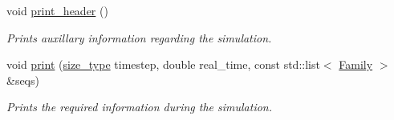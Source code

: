 \begin{DoxyCompactItemize}
void \hyperlink{classretrocombinator_1_1Output_a210fa5a86077912c8cf95d15603c1ad2}{print\+\_\+header} ()
\begin{DoxyCompactList}\small\item\em Prints auxillary information regarding the simulation. \end{DoxyCompactList}\item 
\mbox{\label{classretrocombinator_1_1Output_a9b28f297886b9e8f1e764b688c9a9da7}} 
void \hyperlink{classretrocombinator_1_1Output_a9b28f297886b9e8f1e764b688c9a9da7}{print} (\hyperlink{namespaceretrocombinator_a8e1541b50cee66a791df4c437ccbb385}{size\+\_\+type} timestep, double real\+\_\+time, const std\+::list$<$ \hyperlink{classretrocombinator_1_1Family}{Family} $>$ \&seqs)
\begin{DoxyCompactList}\small\item\em Prints the required information during the simulation. \end{DoxyCompactList}\end{DoxyCompactItemize}
